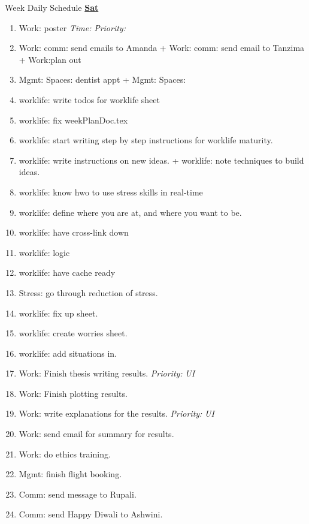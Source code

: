 \documentclass[serif, mathserif, final]{beamer}
\newcommand{\timeEst}[1]{\textit{Time:} \textit{#1}}
\newcommand{\priority}[1]{\textit{Priority:} \textit{#1}}
\newcommand{\deadline}[1]{#1}
\begin{document}
\begin{frame}{}
\begin{columns}
\begin{column}{0.50\linewidth}
\begin{block}{Week Daily Schedule}
\textbf{\small \underline{Sat}} 
\begin{enumerate} 
\item \tiny Work: poster  \deadline{  }  \timeEst{   }  \priority{ } 
\item \tiny Work: comm:  send emails  to Amanda + Work: comm: send email to Tanzima  + Work:plan out 
\item \tiny Mgmt: Spaces: dentist appt  + Mgmt: Spaces: 
\item \tiny worklife: write todos for worklife sheet 
\item \tiny worklife: fix weekPlanDoc.tex 
\item \tiny worklife: start writing step by step instructions for worklife maturity. 

\item \tiny worklife: write instructions on new ideas.  + worklife: note techniques to build ideas.  

\item \tiny worklife: know hwo to use stress skills in real-time 

\item \tiny worklife: define where you are at, and where you want to be. 

\item \tiny worklife: have cross-link down  
\item \tiny worklife: logic 
\item \tiny worklife: have cache ready 

  \tiny \item \tiny Stress: go through reduction of stress. 
\item \tiny worklife: fix up sheet. 
\item \tiny worklife: create worries sheet. 
\item \tiny worklife: add situations in. 
\item \tiny Work: Finish thesis writing results. \priority{UI}
\item \tiny Work: Finish plotting results. 
\item \tiny Work: write explanations for the results. \priority{UI} 
\item \tiny Work: send email for summary for results. 
\item \tiny Work: do ethics training.  
\item \tiny Mgmt: finish flight booking. 
\item \tiny Comm: send message to Rupali. 
\item \tiny Comm: send Happy Diwali to Ashwini. 
\end{enumerate} 


\end{block}
\end{column}
\end{columns}
\end{frame}
\end{document}

